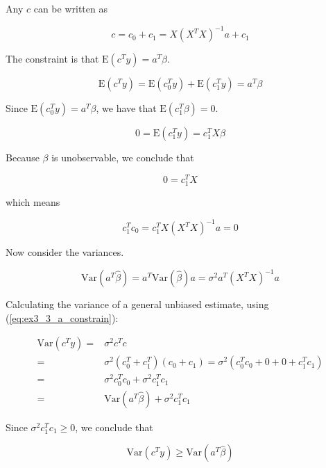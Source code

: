 \documentclass{article}
\begin{document}
Any $c$ can be written as

\begin{equation}
    c = c_0 + c_1 = X(X^TX)^{-1}a + c_1
\end{equation}

The constraint is that $\text{E}(c^Ty) = a^T\beta$.

\begin{equation}
    \text{E}(c^Ty) = \text{E}(c^T_0 y) + \text{E}(c^T_1 y) = a^T \beta
\end{equation}

Since $\text{E}(c^T_0 y) = a^T \beta$, we have that $\text{E}(c^T_1 \beta) = 0$.

\begin{equation}
    0 = \text{E}(c^T_1 y) = c^T_1 X \beta
\end{equation}

Because $\beta$ is unobservable, we conclude that

\begin{equation}
    0 = c^T_1 X
\end{equation}

which means

\begin{equation} \label{eq:ex3_3_a_constrain}
    c^T_1 c_0 = c^T_1 X (X^TX)^{-1}a = 0
\end{equation}

Now consider the variances.

\begin{equation}
    \text{Var}(a^T \hat{\beta}) = a^T \text{Var}(\hat{\beta}) a = \sigma^2 a^T (X^TX)^{-1} a
\end{equation}

Calculating the variance of a general unbiased estimate, using (\ref{eq:ex3_3_a_constrain}):

\begin{equation}
\begin{split}
    \text{Var}(c^T y) =& \sigma^2 c^T c\\
    =& \sigma^2 (c^T_0 + c^T_1)(c_0 + c_1) = \sigma^2 (c^T_0 c_0 + 0 + 0 + c^T_1 c_1)\\
    =& \sigma^2 c^T_0 c_0 + \sigma^2 c^T_1 c_1\\
    =& \text{Var}(a^T \hat{\beta}) + \sigma^2 c^T_1 c_1
\end{split}
\end{equation}

Since $\sigma^2 c^T_1 c_1 \ge 0$, we conclude that

\begin{equation}
    \text{Var}(c^Ty) \ge \text{Var}(a^T\hat{\beta})
\end{equation}
\end{document}
